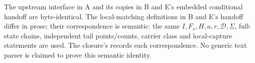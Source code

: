 The upstream interface in A and its copies in B and E's embedded
conditional handoff are byte-identical. The local-matching definitions
in B and E's handoff differ in prose; their correspondence is semantic:
the same \(I,F_s,H,a,r,\mathcal D,\Sigma\), full-state chains,
independent tail points/counts, carrier class and local-capture
statements are used. The closure's 
records each correspondence. No generic text parser is claimed to
prove this semantic identity.



